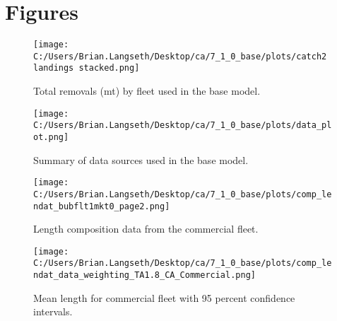 \documentclass[11pt,
  english,
  a4paper,
]{article}
\begin{document}
\newpage

\clearpage


\hypertarget{figures}{%
\section{Figures}\label{figures}}

\leavevmode\tagmcend\tagstructend


\begin{figure}
\centering
\texttt{[image: C:/Users/Brian.Langseth/Desktop/ca/7\_1\_0\_base/plots/catch2 landings stacked.png]}
\caption{Total removals (mt) by fleet used in the base model.\label{fig:catch}}
\end{figure}

\tagmcend\tagstructend


\begin{figure}
\centering
\texttt{[image: C:/Users/Brian.Langseth/Desktop/ca/7\_1\_0\_base/plots/data\_plot.png]}
\caption{Summary of data sources used in the base model.\label{fig:data-plot}}
\end{figure}

\tagmcend\tagstructend


\begin{figure}
\centering
\texttt{[image: C:/Users/Brian.Langseth/Desktop/ca/7\_1\_0\_base/plots/comp\_lendat\_bubflt1mkt0\_page2.png]}
\caption{Length composition data from the commercial fleet.\label{fig:com-len-data}}
\end{figure}

\tagmcend\tagstructend


\begin{figure}
\centering
\texttt{[image: C:/Users/Brian.Langseth/Desktop/ca/7\_1\_0\_base/plots/comp\_lendat\_data\_weighting\_TA1.8\_CA\_Commercial.png]}
\caption{Mean length for commercial fleet with 95 percent confidence intervals.\label{fig:mean-com-len-data}}
\end{figure}
\end{document}
